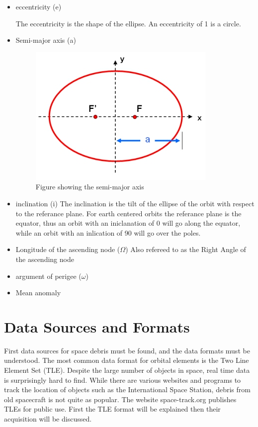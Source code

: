 \documentclass[12pt]{report}
\begin{document}
	\begin{itemize}
		\item eccentricity (e)
		
		The eccentricity is the shape of the ellipse. An eccentricity of 1 is a circle.
		\item Semi-major axis (a)
		\begin{figure}
			\centering
			\includegraphics[width=0.7\linewidth]{semi_majoraxis}
			\caption{Figure showing the semi-major axis\cite{semMaxis}}
			\label{fig:semimajoraxis}
		\end{figure}
		
		\item inclination (i)
		The inclination is the tilt of the ellipse of the orbit with respect to the referance plane. For earth centered orbits the referance plane is the equator, thus an orbit with an iniclanation of 0 will go along the equator, while an orbit with an inlication of 90 will go over the poles. 
		\item Longitude of the ascending node ($\Omega$)
		Also refereed to as the Right Angle of the ascending node 
		\item argument of perigee ($\omega$)
		\item Mean anomaly
	\end{itemize}

\fi	

	
	\newpage
	\section{Data Sources and Formats}
	
	
	
	First data sources for space debris must be found, and the data formats must be understood. The most common data format for orbital elements is the Two Line Element Set (TLE). Despite the large number of objects in space, real time data is surprisingly hard to find. While there are various websites and programs to track the location of objects such as the International Space Station, debris from old spacecraft is not quite as popular. The website space-track.org publishes TLEs for public use. First the TLE format will be explained then their acquisition will be discussed. 
	
\end{document}
